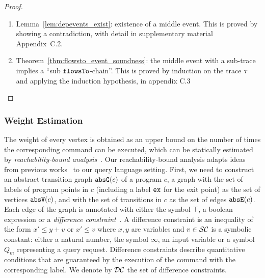 {\begin{proof}
\begin{thm}[$\eventdep$ implies $\flowsto$]
  \end{thm}
\begin{enumerate}
  \item Lemma~\ref{lem:depevents_exist}: existence of a middle event. 
  This is proved by showing a contradiction, with detail in supplementary material Appendix~C.2.%
  \item Theorem~\ref{thm:flowsto_event_soundness}: the middle event with a sub-trace implies a ``sub $\flowsto$-chain''. 
  This is proved by induction on the trace $\mathtt{\tau}$ and applying the induction hypothesis, in appendix C.3
\end{enumerate}
\end{proof}
}
\subsubsection{Weight Estimation}
\label{sec:alg_weightgen}

The weight of every vertex is obtained as an upper bound on 
the number of times the corresponding command can be executed,
which can be statically estimated by \emph{reachability-bound analysis}~\cite{GulwaniZ10}.
Our reachability-bound analysis adapts ideas from previous works~\cite{ZulegerGSV11,SinnZV14,sinn2017complexity} 
to our query language setting. First, we need to 
construct an abstract transition graph $\mathtt{abs}{\mathtt{G}}(c)$ of a program $c$, a
graph with the set of labels of program points in $c$  (including a 
label $\mathtt{ex}$ for the exit point) as the set of
vertices $\mathtt{abs}{\mathtt{V}}(c)$, and with the set of transitions in $c$ as the set of
edges $\mathtt{abs}{\mathtt{E}}(c)$. Each edge of the graph is annotated with either
the symbol $\top$, a boolean expression or a \emph{difference
constraint}~\cite{sinn2017complexity}. A difference constraint is an
inequality of the form $x' \leq y + v$ {or $x' \leq v$}
where $x, y$ are variables and $v \in \mathcal{SC}$ is a symbolic
constant: either a natural number, the symbol $\infty$, an input
variable or a symbol $Q_m$ representing a query request. Difference constraints describe
quantitative conditions that are guaranteed by the execution of the command with
the corresponding label. We denote by
$\mathcal{DC}$ the set of difference constraints.
%

